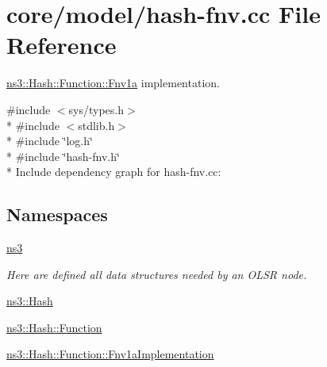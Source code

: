 \hypertarget{hash-fnv_8cc}{}\section{core/model/hash-\/fnv.cc File Reference}
\label{hash-fnv_8cc}


\hyperlink{classns3_1_1Hash_1_1Function_1_1Fnv1a}{ns3\+::\+Hash\+::\+Function\+::\+Fnv1a} implementation.  


{\ttfamily \#include $<$sys/types.\+h$>$}\\*
{\ttfamily \#include $<$stdlib.\+h$>$}\\*
{\ttfamily \#include \char`\"{}log.\+h\char`\"{}}\\*
{\ttfamily \#include \char`\"{}hash-\/fnv.\+h\char`\"{}}\\*
Include dependency graph for hash-\/fnv.cc\+:
\subsection*{Namespaces}
\begin{DoxyCompactItemize}
\item 
 \hyperlink{namespacens3}{ns3}
\begin{DoxyCompactList}\small\item\em Here are defined all data structures needed by an O\+L\+SR node. \end{DoxyCompactList}\item 
 \hyperlink{namespacens3_1_1Hash}{ns3\+::\+Hash}
\item 
 \hyperlink{namespacens3_1_1Hash_1_1Function}{ns3\+::\+Hash\+::\+Function}
\item 
 \hyperlink{namespacens3_1_1Hash_1_1Function_1_1Fnv1aImplementation}{ns3\+::\+Hash\+::\+Function\+::\+Fnv1a\+Implementation}
\end{DoxyCompactItemize}
